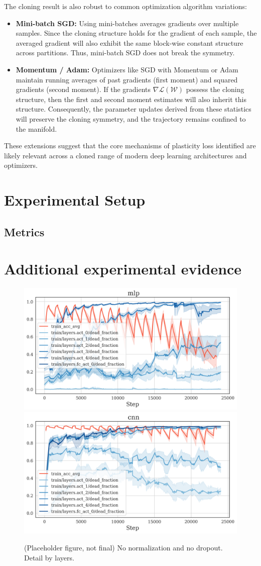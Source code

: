 \documentclass{article}
\newcommand{\Loss}{\mathcal{L}}
\begin{document}
The cloning result is also robust to common optimization algorithm variations:
\begin{itemize}
    \item \textbf{Mini-batch SGD:} Using mini-batches averages gradients over multiple samples. Since the cloning structure holds for the gradient of each sample, the averaged gradient will also exhibit the same block-wise constant structure across partitions. Thus, mini-batch SGD does not break the symmetry.
    \item \textbf{Momentum / Adam:} Optimizers like SGD with Momentum or Adam maintain running averages of past gradients (first moment) and squared gradients (second moment). If the gradients $\nabla\Loss(\mathcal{W})$ possess the cloning structure, then the first and second moment estimates will also inherit this structure. Consequently, the parameter updates derived from these statistics will preserve the cloning symmetry, and the trajectory remains confined to the manifold.
\end{itemize}
These extensions suggest that the core mechanisms of plasticity loss identified are likely relevant across a cloned range of modern deep learning architectures and optimizers.

\section{Experimental Setup}

\subsection{Metrics}

\section{Additional experimental evidence}


\begin{figure}[h!]
    \centering
    \includegraphics[width=0.45\linewidth]{paper/images/dead_frac_mlp_layer_detail.png}
    \includegraphics[width=0.45\linewidth]{paper/images/dead_frac_cnn_layer_detail.png}
    \caption{(Placeholder figure, not final) No normalization and no dropout. Detail by layers.}
    \label{fig:DeadReLUs-LoP}
\end{figure}
\newpage
\end{document}

